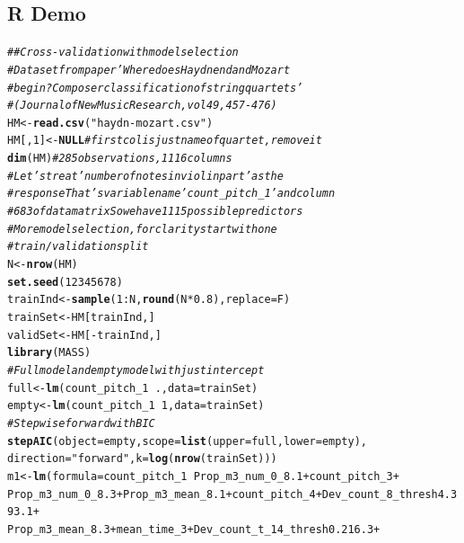 \documentclass[oneside]{book}\usepackage[]{graphicx}\usepackage[dvipsnames,table,xcdraw]{xcolor}
\makeatletter
\newcommand{\hlnum}[1]{\textcolor[rgb]{0.686,0.059,0.569}{#1}}%
\newcommand{\hlstr}[1]{\textcolor[rgb]{0.192,0.494,0.8}{#1}}%
\newcommand{\hlcom}[1]{\textcolor[rgb]{0.678,0.584,0.686}{\textit{#1}}}%
\newcommand{\hlopt}[1]{\textcolor[rgb]{0,0,0}{#1}}%
\newcommand{\hlstd}[1]{\textcolor[rgb]{0.345,0.345,0.345}{#1}}%
\newcommand{\hlkwa}[1]{\textcolor[rgb]{0.161,0.373,0.58}{\textbf{#1}}}%
\newcommand{\hlkwb}[1]{\textcolor[rgb]{0.69,0.353,0.396}{#1}}%
\newcommand{\hlkwc}[1]{\textcolor[rgb]{0.333,0.667,0.333}{#1}}%
\newcommand{\hlkwd}[1]{\textcolor[rgb]{0.737,0.353,0.396}{\textbf{#1}}}%
\newenvironment{kframe}{%
 \def\at@end@of@kframe{}%
 \ifinner\ifhmode%
  \def\at@end@of@kframe{\end{minipage}}%
  \begin{minipage}{\columnwidth}%
 \fi\fi%
 \def\FrameCommand##1{\hskip\@totalleftmargin \hskip-\fboxsep
 \colorbox{shadecolor}{##1}\hskip-\fboxsep
     \hskip-\linewidth \hskip-\@totalleftmargin \hskip\columnwidth}%
 \MakeFramed {\advance\hsize-\width
   \@totalleftmargin\z@ \linewidth\hsize
   \@setminipage}}%
 {\par\unskip\endMakeFramed%
 \at@end@of@kframe}
\newenvironment{knitrout}{}{} %
\makeatother
\begin{document}
\subsection{R Demo}
\begin{knitrout}
\color{fgcolor}\begin{kframe}
\begin{alltt}
\hlcom{## Cross-validation with model selection}
\hlcom{# Dataset from paper 'Where does Haydn end and Mozart}
\hlcom{# begin?  Composer classification of string quartets'}
\hlcom{# (Journal of New Music Research, vol 49, 457-476)}
\hlstd{HM} \hlkwb{<-} \hlkwd{read.csv}\hlstd{(}\hlstr{"haydn-mozart.csv"}\hlstd{)}
\hlstd{HM[,} \hlnum{1}\hlstd{]} \hlkwb{<-} \hlkwa{NULL}  \hlcom{# first col is just name of quartet, remove it}
\hlkwd{dim}\hlstd{(HM)}  \hlcom{# 285 observations, 1116 columns}
\hlcom{# Let's treat 'number of notes in violin part' as the}
\hlcom{# response That's variable name 'count_pitch_1' and column}
\hlcom{# 683 of data matrix So we have 1115 possible predictors}
\hlcom{# More model selection, for clarity start with one}
\hlcom{# train/validation split}
\hlstd{N} \hlkwb{<-} \hlkwd{nrow}\hlstd{(HM)}
\hlkwd{set.seed}\hlstd{(}\hlnum{12345678}\hlstd{)}
\hlstd{trainInd} \hlkwb{<-} \hlkwd{sample}\hlstd{(}\hlnum{1}\hlopt{:}\hlstd{N,} \hlkwd{round}\hlstd{(N} \hlopt{*} \hlnum{0.8}\hlstd{),} \hlkwc{replace} \hlstd{= F)}
\hlstd{trainSet} \hlkwb{<-} \hlstd{HM[trainInd, ]}
\hlstd{validSet} \hlkwb{<-} \hlstd{HM[}\hlopt{-}\hlstd{trainInd, ]}
\hlkwd{library}\hlstd{(MASS)}
\hlcom{# Full model and empty model with just intercept}
\hlstd{full} \hlkwb{<-} \hlkwd{lm}\hlstd{(count_pitch_1} \hlopt{~} \hlstd{.,} \hlkwc{data} \hlstd{= trainSet)}
\hlstd{empty} \hlkwb{<-} \hlkwd{lm}\hlstd{(count_pitch_1} \hlopt{~} \hlnum{1}\hlstd{,} \hlkwc{data} \hlstd{= trainSet)}
\hlcom{# Stepwise forward with BIC}
\hlkwd{stepAIC}\hlstd{(}\hlkwc{object} \hlstd{= empty,} \hlkwc{scope} \hlstd{=} \hlkwd{list}\hlstd{(}\hlkwc{upper} \hlstd{= full,} \hlkwc{lower} \hlstd{= empty),}
  \hlkwc{direction} \hlstd{=} \hlstr{"forward"}\hlstd{,} \hlkwc{k} \hlstd{=} \hlkwd{log}\hlstd{(}\hlkwd{nrow}\hlstd{(trainSet)))}
\hlstd{m1} \hlkwb{<-} \hlkwd{lm}\hlstd{(}\hlkwc{formula} \hlstd{= count_pitch_1} \hlopt{~} \hlstd{Prop_m3_num_0_8.1} \hlopt{+} \hlstd{count_pitch_3} \hlopt{+}
  \hlstd{Prop_m3_num_0_8.3} \hlopt{+} \hlstd{Prop_m3_mean_8.1} \hlopt{+} \hlstd{count_pitch_4} \hlopt{+} \hlstd{Dev_count_8_thresh4.393.1} \hlopt{+}
  \hlstd{Prop_m3_mean_8.3} \hlopt{+} \hlstd{mean_time_3} \hlopt{+} \hlstd{Dev_count_t_14_thresh0.216.3} \hlopt{+}

\end{alltt}
\end{kframe}
\end{knitrout}
\end{document}
